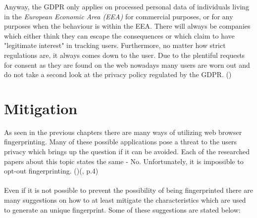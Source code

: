 Anyway, the GDPR only applies on processed personal data of individuals living in the \textit{European Economic Area (EEA)} for commercial purposes, or for any purposes when the behaviour is within the EEA. There will always be companies which either think they can escape the consequences or which claim to have "legitimate interest" in tracking users. Furthermore, no matter how strict regulations are, it always comes down to the user. Due to the plentiful requests for consent as they are found on the web nowadays many users are worn out and do not take a second look at the privacy policy regulated by the GDPR. (\textcite{miele18})

\section{Mitigation} \label{mitigation}
As seen in the previous chapters there are many ways of utilizing web browser fingerprinting. Many of these possible applications pose a threat to the users privacy which brings up the question if it can be avoided. Each of the researched papers about this topic states the same - No. Unfortunately, it is impossible to opt-out fingerprinting. (\textcite{web17})(\textcite{upi15}, p.4)\\\\
Even if it is not possible to prevent the possibility of being fingerprinted there are many suggestions on how to at least mitigate the characteristics which are used to generate an unique fingerprint. Some of these suggestions are stated below:
